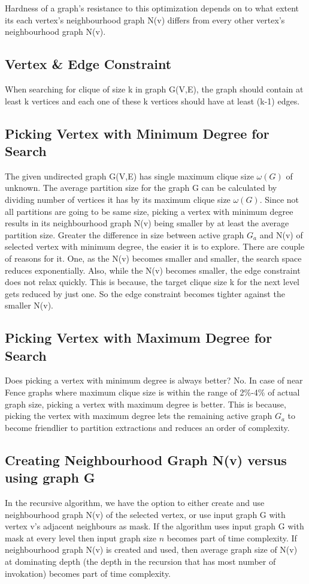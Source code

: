 \documentclass[12pt]{article}
\theoremstyle{plain}
\theoremstyle{definition}
\begin{document}
Hardness of a graph's resistance to this optimization depends on to what extent its each vertex's neighbourhood graph N(v) differs from every other vertex's neighbourhood graph N(v).

\subsection{Vertex \& Edge Constraint}
When searching for clique of size k in graph G(V,E), the graph should contain at least k vertices and each one of these k vertices should have at least (k-1) edges.


\subsection{Picking Vertex with Minimum Degree for Search}
The given undirected graph G(V,E) has single maximum clique size $\omega(G)$ of unknown. The average partition size for the graph G can be calculated by dividing number of vertices it has by its maximum clique size $\omega(G)$. Since not all partitions are going to be same size, picking a vertex with minimum degree results in its neighbourhood graph N(v) being smaller by at least the average partition size. Greater the difference in size between active graph $G_a$ and N(v) of selected vertex with minimum degree, the easier it is to explore. There are couple of reasons for it. One, as the N(v) becomes smaller and smaller, the search space reduces exponentially. Also, while the N(v) becomes smaller, the edge constraint does not relax quickly. This is because, the target clique size k for the next level gets reduced by just one. So the edge constraint becomes tighter against the smaller N(v).

\subsection{Picking Vertex with Maximum Degree for Search}
Does picking a vertex with minimum degree is always better? No. In case of near Fence graphs where maximum clique size is within the range of 2\%-4\% of actual graph size, picking a vertex with maximum degree is better. This is because, picking the vertex with maximum degree lets the remaining active graph $G_a$ to become friendlier to partition extractions and reduces an order of complexity.

\subsection{Creating Neighbourhood Graph N(v) versus using graph G}
In the recursive algorithm, we have the option to either create and use neighbourhood graph N(v) of the selected vertex, or use input graph G with vertex v's adjacent neighbours as mask. If the algorithm uses input graph G with mask at every level then input graph size $n$ becomes part of time complexity. If neighbourhood graph N(v) is created and used, then average graph size of N(v) at dominating depth (the depth in the recursion that has most number of invokation) becomes part of time complexity.
\end{document}
